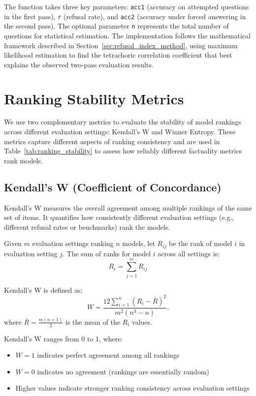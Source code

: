 \documentclass{article} %
\theoremstyle{definition}
\begin{document}
The function takes three key parameters: \texttt{acc1} (accuracy on attempted questions in the first pass), \texttt{r} (refusal rate), and \texttt{acc2} (accuracy under forced answering in the second pass). The optional parameter \texttt{n} represents the total number of questions for statistical estimation. The implementation follows the mathematical framework described in Section~\ref{sec:refusal_index_method}, using maximum likelihood estimation to find the tetrachoric correlation coefficient that best explains the observed two-pass evaluation results.

\section{Ranking Stability Metrics}
\label{app:ranking_metrics}

We use two complementary metrics to evaluate the stability of model rankings across different evaluation settings: Kendall's W and Winner Entropy. These metrics capture different aspects of ranking consistency and are used in Table~\ref{tab:ranking_stability} to assess how reliably different factuality metrics rank models.

\subsection{Kendall's W (Coefficient of Concordance)}

Kendall's W measures the overall agreement among multiple rankings of the same set of items. It quantifies how consistently different evaluation settings (e.g., different refusal rates or benchmarks) rank the models.

Given $m$ evaluation settings ranking $n$ models, let $R_{ij}$ be the rank of model $i$ in evaluation setting $j$. The sum of ranks for model $i$ across all settings is:
\[
R_i = \sum_{j=1}^{m} R_{ij}
\]

Kendall's W is defined as:
\[
W = \frac{12 \sum_{i=1}^{n} (R_i - \bar{R})^2}{m^2(n^3 - n)}.
\]
where $\bar{R} = \frac{m(n+1)}{2}$ is the mean of the $R_i$ values.

Kendall's W ranges from 0 to 1, where:
\begin{itemize}
    \item $W = 1$ indicates perfect agreement among all rankings
    \item $W = 0$ indicates no agreement (rankings are essentially random)
    \item Higher values indicate stronger ranking consistency across evaluation settings
\end{itemize}
\end{document}
